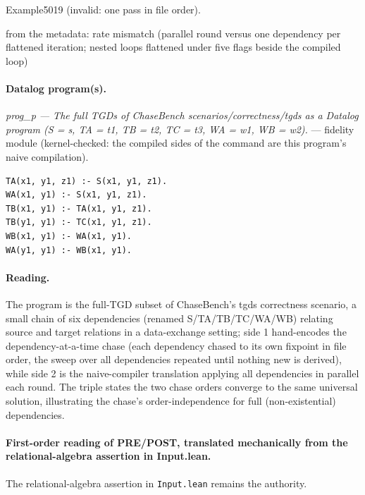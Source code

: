 \documentclass[10pt]{article}
\begin{document}
\begin{description}[leftmargin=2.6cm,style=nextline,itemsep=1pt]
\item[Twin] Example5019 (invalid: one pass in file order).

\item[Obstruction note] from the metadata: rate mismatch (parallel round versus one dependency per flattened iteration; nested loops flattened under five flags beside the compiled loop)

\end{description}

\paragraph{Datalog program(s).}

{\raggedright\textit{prog\_p --- The full TGDs of ChaseBench scenarios/correctness/tgds as a Datalog program (S = s, TA = t1, TB = t2, TC = t3, WA = w1, WB = w2).} --- fidelity module (kernel-checked: the compiled sides of the command are this program's naive compilation).\par}

\begin{Verbatim}[fontsize=\scriptsize,breaklines=true,breakanywhere=true,frame=single,framesep=1.5mm]
TA(x1, y1, z1) :- S(x1, y1, z1).
WA(x1, y1) :- S(x1, y1, z1).
TB(x1, y1) :- TA(x1, y1, z1).
TB(y1, y1) :- TC(x1, y1, z1).
WB(x1, y1) :- WA(x1, y1).
WA(y1, y1) :- WB(x1, y1).
\end{Verbatim}

\paragraph{Reading.} The program is the full-TGD subset of ChaseBench's tgds correctness scenario, a small chain of six dependencies (renamed S/TA/TB/TC/WA/WB) relating source and target relations in a data-exchange setting; side 1 hand-encodes the dependency-at-a-time chase (each dependency chased to its own fixpoint in file order, the sweep over all dependencies repeated until nothing new is derived), while side 2 is the naive-compiler translation applying all dependencies in parallel each round. The triple states the two chase orders converge to the same universal solution, illustrating the chase's order-independence for full (non-existential) dependencies.

\paragraph{First-order reading of PRE/POST, translated mechanically from the relational-algebra assertion in Input.lean.} The relational-algebra assertion in \texttt{Input.lean} remains the authority.
\end{document}
